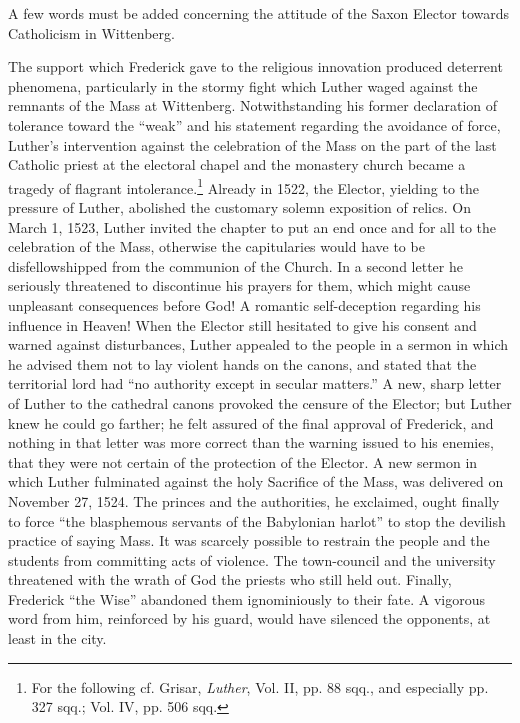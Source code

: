 A few words must be added concerning the attitude of the Saxon
Elector towards Catholicism in Wittenberg.

The support which Frederick gave to the religious innovation
produced deterrent phenomena, particularly in the stormy fight
which Luther waged against the remnants of the Mass at Wittenberg.
Notwithstanding his former declaration of tolerance toward the
“weak” and his statement regarding the avoidance of force, Luther’s
intervention against the celebration of the Mass on the part of the
last Catholic priest at the electoral chapel and the monastery church
became a tragedy of flagrant intolerance.\footnote
{For the following cf. Grisar, \textit{Luther}, Vol. II, pp. 88 sqq., and especially pp. 327 sqq.;
Vol. IV, pp. 506 sqq.}
Already in 1522, the
Elector, yielding to the pressure of Luther, abolished the customary
solemn exposition of relics. On March 1, 1523, Luther invited the
chapter to put an end once and for all to the celebration of the
Mass, otherwise the capitularies would have to be disfellowshipped
from the communion of the Church. In a second letter he seriously
threatened to discontinue his prayers for them, which might cause
unpleasant consequences before God! A romantic self-deception regarding
his influence in Heaven! When the Elector still hesitated to
give his consent and warned against disturbances, Luther appealed
to the people in a sermon in which he advised them not to lay violent
hands on the canons, and stated that the territorial lord had “no
authority except in secular matters.” A new, sharp letter of Luther
to the cathedral canons provoked the censure of the Elector; but
Luther knew he could go farther; he felt assured of the final approval
of Frederick, and nothing in that letter was more correct
than the warning issued to his enemies, that they were not certain
of the protection of the Elector. A new sermon in which Luther
fulminated against the holy Sacrifice of the Mass, was delivered on
November 27, 1524. The princes and the authorities, he exclaimed,
ought finally to force “the blasphemous servants of the Babylonian
harlot” to stop the devilish practice of saying Mass. It was scarcely
possible to restrain the people and the students from committing
acts of violence. The town-council and the university threatened
with the wrath of God the priests who still held out. Finally,
Frederick “the Wise” abandoned them ignominiously to their fate.
A vigorous word from him, reinforced by his guard, would have
silenced the opponents, at least in the city.

